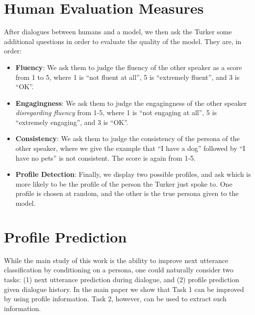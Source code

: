 \section{Human Evaluation Measures}

After dialogues between humans and a model, we then ask the Turker some additional questions in order to evaluate the quality of the model. 
They are, in order:
\begin{itemize}
\item {\bf Fluency}: We ask them to judge the fluency of the other speaker as a score from 1 to 5, where 1 is ``not fluent at all'', 5 is ``extremely fluent'', and 3 is ``OK''. 

\item {\bf Engagingness}: We ask them to judge the engagingness of the other speaker {\em disregarding fluency} from 1-5, where 1 is ``not engaging at all'', 5 is ``extremely engaging'', and 3 is ``OK''.

\item {\bf Consistency}: We ask them to judge the consistency of the persona of the other speaker, where we give the example that ``I have a dog''  followed by ``I have no pets'' is not consistent. The score is again from 1-5.

\item {\bf Profile Detection}: Finally, we display two possible profiles, and ask which is more likely to be the profile of the person the Turker just spoke to. One profile is chosen at random, and the other is the true persona given to the model.
\end{itemize}

\section{Profile Prediction}\label{app:profile-pred}

While the main study of this work is the ability to improve next utterance classification
by conditioning on a persona, 
one could naturally consider two tasks:
(1) next utterance prediction during dialogue, and (2) profile prediction given dialogue history. 
In the main paper we show that Task 1 can be improved by using profile information.
Task 2, however, can be used to extract such information.

